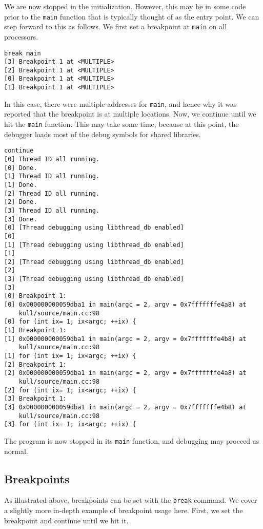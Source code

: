 \documentclass{refart}
\begin{document}
We are now stopped in the initialization. However, this may be in some code prior to the \texttt{main} function that is typically thought of as the entry point. We can step forward to this as follows. We first set a breakpoint at \texttt{main} on all processors.

\begin{Verbatim}
break main
[3] Breakpoint 1 at <MULTIPLE>
[2] Breakpoint 1 at <MULTIPLE>
[0] Breakpoint 1 at <MULTIPLE>
[1] Breakpoint 1 at <MULTIPLE>
\end{Verbatim}

In this case, there were multiple addresses for \texttt{main}, and hence why it was reported that the breakpoint is at multiple locations. Now, we continue until we hit the \texttt{main} function. This may take some time, because at this point, the debugger loads most of the debug symbols for shared libraries.

\begin{Verbatim}
continue
[0] Thread ID all running.
[0] Done.
[1] Thread ID all running.
[1] Done.
[2] Thread ID all running.
[2] Done.
[3] Thread ID all running.
[3] Done.
[0] [Thread debugging using libthread_db enabled]
[0] 
[1] [Thread debugging using libthread_db enabled]
[1] 
[2] [Thread debugging using libthread_db enabled]
[2] 
[3] [Thread debugging using libthread_db enabled]
[3] 
[0] Breakpoint 1:
[0] 0x000000000059dba1 in main(argc = 2, argv = 0x7fffffffe4a8) at
    kull/source/main.cc:98
[0] for (int ix= 1; ix<argc; ++ix) {
[1] Breakpoint 1:
[1] 0x000000000059dba1 in main(argc = 2, argv = 0x7fffffffe4b8) at
    kull/source/main.cc:98
[1] for (int ix= 1; ix<argc; ++ix) {
[2] Breakpoint 1:
[2] 0x000000000059dba1 in main(argc = 2, argv = 0x7fffffffe4a8) at
    kull/source/main.cc:98
[2] for (int ix= 1; ix<argc; ++ix) {
[3] Breakpoint 1:
[3] 0x000000000059dba1 in main(argc = 2, argv = 0x7fffffffe4b8) at
    kull/source/main.cc:98
[3] for (int ix= 1; ix<argc; ++ix) {
\end{Verbatim}

The program is now stopped in its \texttt{main} function, and debugging may proceed as normal.

\subsection{Breakpoints}

As illustrated above, breakpoints can be set with the \texttt{break} command. We cover a slightly more in-depth example of breakpoint usage here. First, we set the breakpoint and continue until we hit it.
\end{document}
